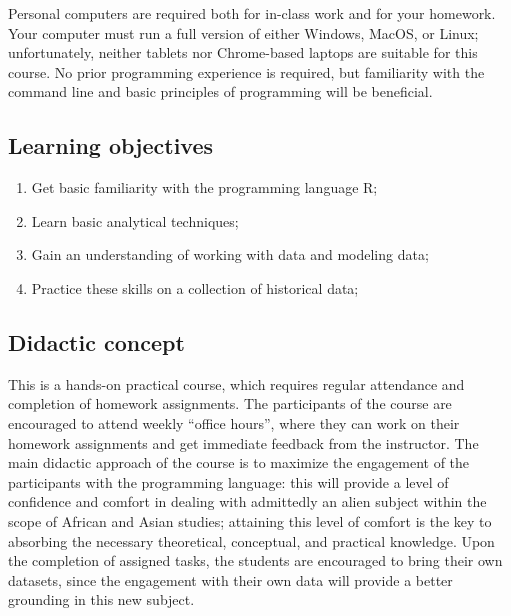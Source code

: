 \documentclass[
]{book}
\providecommand{\tightlist}{%
  \setlength{\itemsep}{0pt}\setlength{\parskip}{0pt}}
\begin{document}
Personal computers are required both for in-class work and for your homework. Your computer must run a full version of either Windows, MacOS, or Linux; unfortunately, neither tablets nor Chrome-based laptops are suitable for this course. No prior programming experience is required, but familiarity with the command line and basic principles of programming will be beneficial.

\hypertarget{learning-objectives}{%
\subsection*{Learning objectives}\label{learning-objectives}}

\begin{enumerate}
\def\labelenumi{\arabic{enumi}.}
\tightlist
\item
  Get basic familiarity with the programming language R;
\item
  Learn basic analytical techniques;
\item
  Gain an understanding of working with data and modeling data;
\item
  Practice these skills on a collection of historical data;
\end{enumerate}

\hypertarget{didactic-concept}{%
\subsection*{Didactic concept}\label{didactic-concept}}

This is a hands-on practical course, which requires regular attendance and completion of homework assignments. The participants of the course are encouraged to attend weekly ``office hours'', where they can work on their homework assignments and get immediate feedback from the instructor. The main didactic approach of the course is to maximize the engagement of the participants with the programming language: this will provide a level of confidence and comfort in dealing with admittedly an alien subject within the scope of African and Asian studies; attaining this level of comfort is the key to absorbing the necessary theoretical, conceptual, and practical knowledge. Upon the completion of assigned tasks, the students are encouraged to bring their own datasets, since the engagement with their own data will provide a better grounding in this new subject.
\end{document}
